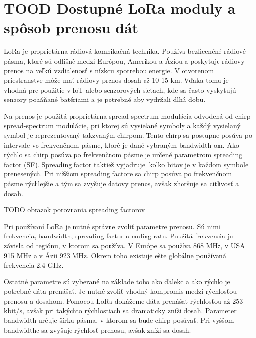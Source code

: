 \documentclass[czech,master]{diploma}
\begin{document}
\MakeTitlePages


\listoftables
\clearpage


\chapter{TOOD Dostupné LoRa moduly a spôsob prenosu dát}
LoRa je proprietárna rádiová komnikačná technika.
Používa bezlicenčné rádiové pásma, ktoré sú odlišné medzi Európou, Amerikou a Áziou a poskytuje rádiovy prenos na veľkú vzdialenosť s nízkou spotrebou energie.
V otvorenom priestranstve môže mať rádiovy prenos dosah až 10-15 km.
Vďaka tomu je vhodná pre použitie v IoT alebo senzorových sieťach, kde sa často vyskytujú senzory poháňané batériami a je potrebné aby vydržali dlhú dobu.

Na prenos je použitá proprietárna spread-spectrum modulácia odvodená od chirp spread-spectrum modulácie, pri ktorej sú 
vysielané symboly a každý vysielaný symbol je reprezentovaný takzvaným chirpom. Tento chirp sa postupne posúva po intervale 
vo frekvenčnom pásme, ktoré je dané vybraným bandwidth-om. 
Ako rýchlo sa chirp posúva po frekvenčnom pásme je určené parametrom spreading factor (SF). Spreading factor taktiež vyjadruje, kolko bitov je v každom 
symbole prenesených. Pri nižšiom spreading factore sa chirp posúva po frekvenčnom pásme rýchlejšie a tým sa zvyšuje datovy prenos, avšak zhoršuje sa citlivosť a dosah.

TODO obrazok porovnania spreading factorov

Pri používaní LoRa je nutné správne zvoliť parametre prenosu. Sú nimi frekvencia, bandwidth, spreading factor a coding rate.
Použitá frekvencia je závisla od regiónu, v ktorom sa používa. V Európe sa používa 868 MHz, v USA 915 MHz a v Ázii 923 MHz. Okrem toho existuje ešte globálne používaná 
frekvencia 2.4 GHz.

Ostatné parametre sú vyberané na základe toho ako ďaleko a ako rýchlo je potrebné dáta prenášať. Je nutné zvoliť vhodný kompromis medzi rýchlosťou prenosu a dosahom.
Pomocou LoRa dokážeme dáta prenášať rýchlosťou až 253 kbit/s, avšak pri takýchto rýchlostiach sa dramaticky zníži dosah.
Parameter bandwidth určuje šírku pásma, v ktorom sa bude chirp posúvať. Pri vyššom bandwidthe sa zvyšuje rýchlosť prenosu, avšak zníži sa dosah.
\end{document}
